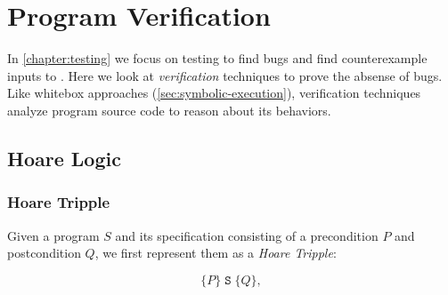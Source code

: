 \documentclass[oneside,11pt,dvipsnames]{book}
\newcommand{\code}[1]{\texttt{#1}}
\begin{document}

\begin{lstlisting}

\end{lstlisting}




\chapter{Program Verification}\label{chap:verification}

In \autoref{chapter:testing} we focus on testing to find bugs and find counterexample inputs to . Here we look at \emph{verification} techniques to prove the absense of bugs. Like whitebox approaches (\autoref{sec:symbolic-execution}), verification techniques analyze program source code to reason about its behaviors. 


\section{Hoare Logic}\label{sec:hoare-logic}
\subsection{Hoare Tripple}

Given a program $S$ and its specification consisting of a precondition $P$ and postcondition $Q$, we first represent them as a \emph{Hoare Tripple}:

\begin{center}
\begin{tcolorbox}[colframe=green!50!black, colback=gray!5!white, boxrule=0.5mm, width=0.5\textwidth, sharp corners]
    \[
    \{ P \} \; \code{S} \; \{ Q \}, 
    \]
\end{tcolorbox}
\end{center}
\end{document}
